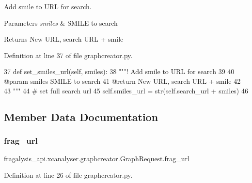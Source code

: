 Add smile to U\+RL for search. 


\begin{DoxyParams}{Parameters}
{\em smiles} & S\+M\+I\+LE to search \\
\hline
\end{DoxyParams}
\begin{DoxyReturn}{Returns}
New U\+RL, search U\+RL + smile 
\end{DoxyReturn}


Definition at line 37 of file graphcreator.\+py.


\begin{DoxyCode}
37     \textcolor{keyword}{def }set\_smiles\_url(self, smiles):
38         \textcolor{stringliteral}{"""! Add smile to URL for search}
39 \textcolor{stringliteral}{}
40 \textcolor{stringliteral}{        @param smiles SMILE to search}
41 \textcolor{stringliteral}{        @return New URL, search URL + smile}
42 \textcolor{stringliteral}{}
43 \textcolor{stringliteral}{        """}
44         \textcolor{comment}{# set full search url}
45         self.smiles\_url = str(self.search\_url + smiles)
46 
\end{DoxyCode}


\subsection{Member Data Documentation}
\mbox{\label{classfragalysis__api_1_1xcanalyser_1_1graphcreator_1_1_graph_request_ac1d452fb3f9d6e80ba3a31e02145d043}} 
\subsubsection{\texorpdfstring{frag\+\_\+url}{frag\_url}}
{\footnotesize\ttfamily fragalysis\+\_\+api.\+xcanalyser.\+graphcreator.\+Graph\+Request.\+frag\+\_\+url}



Definition at line 26 of file graphcreator.\+py.

\mbox{\label{classfragalysis__api_1_1xcanalyser_1_1graphcreator_1_1_graph_request_a564113897c119dfd6dcd066b12d1f481}} 
